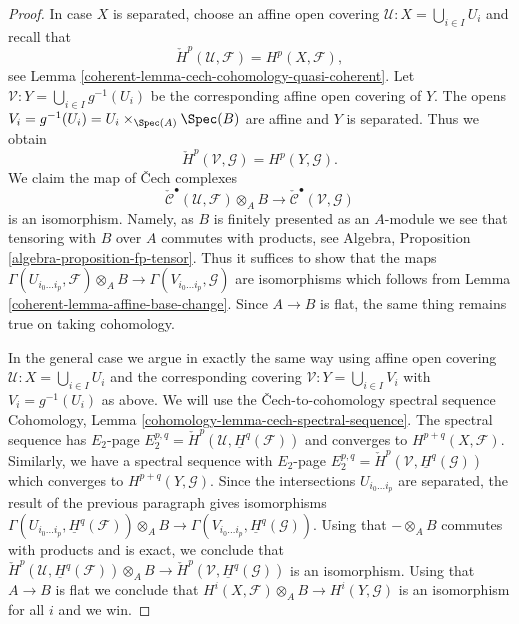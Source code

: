 \begin{proof}

In case $X$ is separated, choose an affine open covering
$\mathcal{U} : X = \bigcup_{i \in I} U_i$ and recall that
$$
\check{H}^p(\mathcal{U}, \mathcal{F}) = H^p(X, \mathcal{F}),
$$
see
Lemma \ref{coherent-lemma-cech-cohomology-quasi-coherent}.
Let $\mathcal{V} : Y = \bigcup_{i \in I} g^{-1}(U_i)$
be the corresponding affine open covering of $Y$.
The opens $V_i = g^{-1}(U_i) = U_i \times_{\Spec(A)} \Spec(B)$
are affine and $Y$ is separated. Thus we obtain
$$
\check{H}^p(\mathcal{V}, \mathcal{G}) = H^p(Y, \mathcal{G}).
$$
We claim the map of {\v C}ech complexes
$$
\check{\mathcal{C}}^\bullet(\mathcal{U}, \mathcal{F}) \otimes_A B
\longrightarrow
\check{\mathcal{C}}^\bullet(\mathcal{V}, \mathcal{G})
$$
is an isomorphism. Namely, as $B$ is finitely presented as an $A$-module
we see that tensoring with $B$ over $A$ commutes with products, see
Algebra, Proposition \ref{algebra-proposition-fp-tensor}.
Thus it suffices to show that the maps
$\Gamma(U_{i_0 \ldots i_p}, \mathcal{F}) \otimes_A B \to
\Gamma(V_{i_0 \ldots i_p}, \mathcal{G})$
are isomorphisms which follows from
Lemma \ref{coherent-lemma-affine-base-change}.
Since $A \to B$ is flat, the same thing remains true on taking cohomology.

\medskip\noindent
In the general case we argue in exactly the same way using affine
open covering $\mathcal{U} : X = \bigcup_{i \in I} U_i$ and the
corresponding covering $\mathcal{V} : Y = \bigcup_{i \in I} V_i$
with $V_i = g^{-1}(U_i)$ as above. We will use the
{\v C}ech-to-cohomology spectral sequence
Cohomology, Lemma \ref{cohomology-lemma-cech-spectral-sequence}.
The spectral sequence has $E_2$-page
$E_2^{p, q} = \check{H}^p(\mathcal{U}, \underline{H}^q(\mathcal{F}))$
and converges to $H^{p + q}(X, \mathcal{F})$.
Similarly, we have a spectral sequence with $E_2$-page
$E_2^{p, q} = \check{H}^p(\mathcal{V}, \underline{H}^q(\mathcal{G}))$
which converges to $H^{p + q}(Y, \mathcal{G})$.
Since the intersections $U_{i_0 \ldots i_p}$ are separated, the result
of the previous paragraph gives isomorphisms
$\Gamma(U_{i_0 \ldots i_p}, \underline{H}^q(\mathcal{F})) \otimes_A B
\to \Gamma(V_{i_0 \ldots i_p}, \underline{H}^q(\mathcal{G}))$.
Using that $- \otimes_A B$ commutes with products and is exact, we conclude
that
$\check{H}^p(\mathcal{U}, \underline{H}^q(\mathcal{F})) \otimes_A B
\to \check{H}^p(\mathcal{V}, \underline{H}^q(\mathcal{G}))$
is an isomorphism. Using that $A \to B$ is flat we conclude that
$H^i(X, \mathcal{F}) \otimes_A B \to H^i(Y, \mathcal{G})$
is an isomorphism for all $i$ and we win.
\end{proof}


